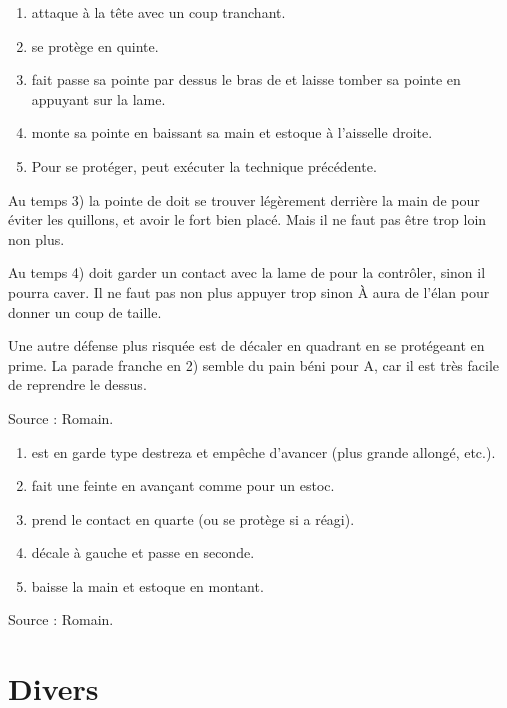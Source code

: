 \begin{technique}

\begin{enumerate}
	\item \A attaque \D à la tête avec un coup tranchant.
	\item \D se protège en quinte.
	\item \D fait passe sa pointe par dessus le bras de \A et laisse tomber sa pointe en appuyant sur la lame.
	\item \D monte sa pointe en baissant sa main et estoque \A à l'aisselle droite.
	\item Pour se protéger, \A peut exécuter la technique précédente.
\end{enumerate}

Au temps 3) la pointe de \D doit se trouver légèrement derrière la main de \A pour éviter les quillons, et avoir le fort bien placé. Mais il ne faut pas être trop loin non plus.

Au temps 4) \D doit garder un contact avec la lame de \A pour la contrôler, sinon il pourra caver. Il ne faut pas non plus appuyer trop sinon À aura de l'élan pour donner un coup de taille.

Une autre défense plus risquée est de décaler en quadrant en se protégeant en prime.
La parade franche en 2) semble du pain béni pour A, car il est très facile de reprendre le dessus.

Source : Romain.

\end{technique}


\begin{technique}

\begin{enumerate}
	\item \A est en garde type destreza et empêche \D d'avancer (plus grande allongé, etc.).
	\item \D fait une feinte en avançant comme pour un estoc.
	\item \D prend le contact en quarte (ou se protège si \A a réagi).
	\item \D décale à gauche et passe en seconde.
	\item \D baisse la main et estoque en montant.
\end{enumerate}

Source : Romain.

\end{technique}


\section{Divers}


